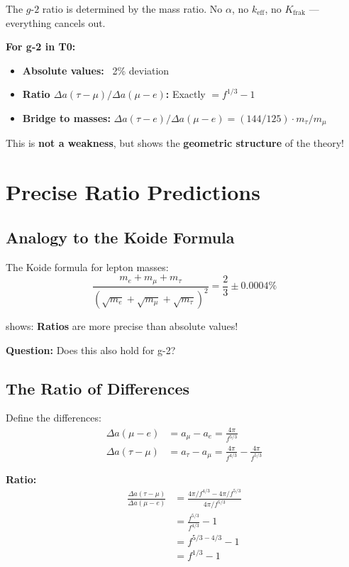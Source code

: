 	The $g$-$2$ ratio is determined by the mass ratio. No $\alpha$, no $k_\text{eff}$, no $K_\text{frak}$ --- everything cancels out.

	\textbf{For g-2 in T0:}
	\begin{itemize}
		\item \textbf{Absolute values:} ~2\% deviation
		\item \textbf{Ratio $\Delta a(\tau-\mu)/\Delta a(\mu-e)$:} Exactly $= f^{1/3} - 1$
		\item \textbf{Bridge to masses:} $\Delta a(\tau{-}e)/\Delta a(\mu{-}e) = (144/125) \cdot m_\tau/m_\mu$
	\end{itemize}
	
	This is \textbf{not a weakness}, but shows the \textbf{geometric structure} of the theory!
	
	\section{Precise Ratio Predictions}
	
	\subsection{Analogy to the Koide Formula}
	
	The Koide formula for lepton masses:
	\begin{equation}
		\frac{m_e + m_\mu + m_\tau}{(\sqrt{m_e} + \sqrt{m_\mu} + \sqrt{m_\tau})^2} = \frac{2}{3} \pm 0.0004\%
	\end{equation}
	
	shows: \textbf{Ratios} are more precise than absolute values!
	
	\textbf{Question:} Does this also hold for g-2?
	
	\subsection{The Ratio of Differences}
	
	Define the differences:
	\begin{align}
		\Delta a(\mu - e) &= a_\mu - a_e = \frac{4\pi}{f^{5/3}} \\
		\Delta a(\tau - \mu) &= a_\tau - a_\mu = \frac{4\pi}{f^{4/3}} - \frac{4\pi}{f^{5/3}}
	\end{align}
	
	\textbf{Ratio:}
	\begin{align}
		\frac{\Delta a(\tau - \mu)}{\Delta a(\mu - e)} &= \frac{4\pi/f^{4/3} - 4\pi/f^{5/3}}{4\pi/f^{5/3}} \\
		&= \frac{f^{5/3}}{f^{4/3}} - 1 \\
		&= f^{5/3 - 4/3} - 1 \\
		&= f^{1/3} - 1
		\label{eq:ratio}
	\end{align}
	
